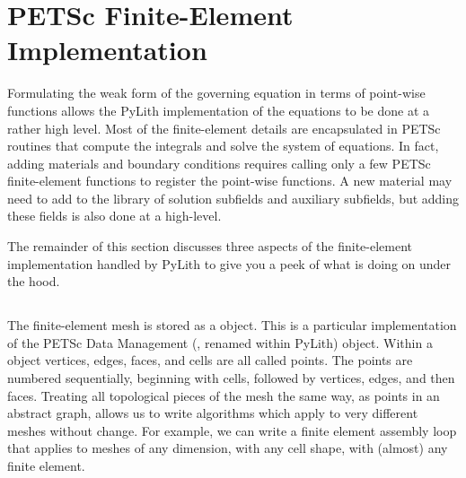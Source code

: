 \section{PETSc Finite-Element Implementation}

Formulating the weak form of the governing equation in terms of
point-wise functions allows the PyLith implementation of the equations
to be done at a rather high level. Most of the finite-element details
are encapsulated in PETSc routines that compute the integrals and
solve the system of equations. In fact, adding materials and boundary
conditions requires calling only a few PETSc finite-element functions
to register the point-wise functions. A new material may need to add
to the library of solution subfields and auxiliary subfields, but
adding these fields is also done at a high-level.

The remainder of this section discusses three aspects of the
finite-element implementation handled by PyLith to give you a peek of
what is doing on under the hood.



\subsection{}

The finite-element mesh is stored as a  object. This is
a particular implementation of the PETSc Data Management (,
renamed  within PyLith) object. Within a
 object vertices, edges, faces, and cells are all
called points. The points are numbered sequentially, beginning with
cells, followed by vertices, edges, and then faces. Treating all
topological pieces of the mesh the same way, as points in an abstract
graph, allows us to write algorithms which apply to very different
meshes without change. For example, we can write a finite element
assembly loop that applies to meshes of any dimension, with any cell
shape, with (almost) any finite element.

